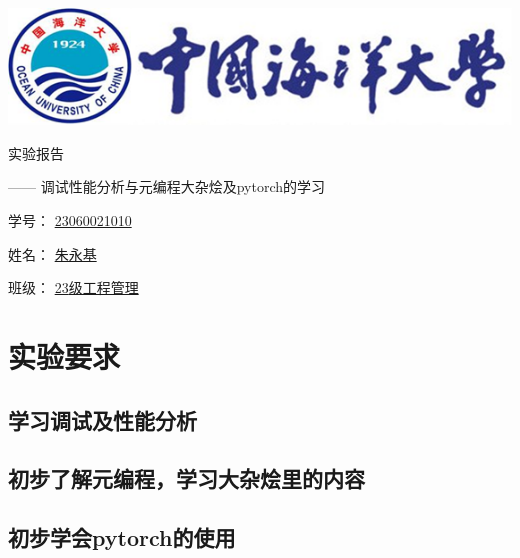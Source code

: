\documentclass[UTF8,a4paper]{ctexart}
\begin{document}
\begin{sloppypar}


	\begin{center}
	\includegraphics[width = 14cm]{picture/s1}

		\begin{fontsize}{60pt}{20pt}
			实验报告
		\end{fontsize}

		\bigskip
		\bigskip
		
		\begin{fontsize}{20pt}{20pt}
			\begin{flushright}
				—— 调试性能分析与元编程大杂烩及{\Huge pytorch}的学习
			\end{flushright}
		\end{fontsize}
		
		\bigskip
		\bigskip
		\bigskip
		\bigskip
		\bigskip
		\bigskip
		\bigskip
		\bigskip
		\bigskip
		\bigskip
		\bigskip
		\bigskip
		\bigskip
		\bigskip
		\bigskip
		\bigskip
		
		\begin{fontsize}{25pt}{20pt}

			学号：
			\underline{{\huge 23060021010}}
			\bigskip
			\bigskip
			\bigskip
			\bigskip

			姓名：
			\underline{朱永基}
			\bigskip
			\bigskip
			\bigskip
			\bigskip

			班级：
			\underline{{\Huge 23}级工程管理}
				
		\end{fontsize}
	\end{center}
	\section{实验要求}
	\subsection{学习调试及性能分析}
	\subsection{初步了解元编程，学习大杂烩里的内容}
	\subsection{初步学会pytorch的使用}

\end{sloppypar}
\end{document}
